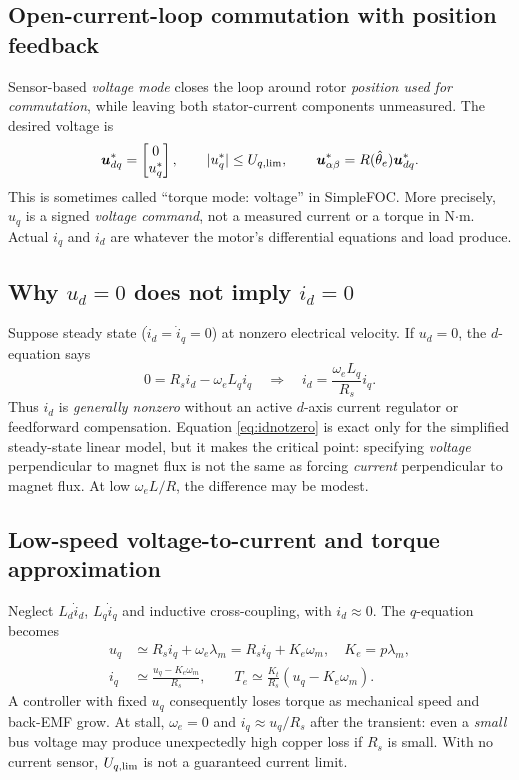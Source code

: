 \documentclass[10pt,letterpaper]{article}
\begin{document}
\subsection{Open-current-loop commutation with position feedback}
Sensor-based \emph{voltage mode} closes the loop around rotor \emph{position used for commutation}, while leaving both stator-current components unmeasured. The desired voltage is
\begin{equation}\label{eq:voltmode}
\bm u_{dq}^*=\begin{bmatrix}0\\u_q^*\end{bmatrix},\qquad
|u_q^*|\le U_{q,\rm lim},\qquad \bm u_{\alpha\beta}^*=R(\hat\theta_e)\bm u_{dq}^*.
\end{equation}
This is sometimes called ``torque mode: voltage'' in SimpleFOC. More precisely, $u_q$ is a signed \emph{voltage command}, not a measured current or a torque in N$\cdot$m. Actual $i_q$ and $i_d$ are whatever the motor's differential equations and load produce.

\subsection{Why $u_d=0$ does not imply $i_d=0$}
Suppose steady state ($\dot i_d=\dot i_q=0$) at nonzero electrical velocity. If $u_d=0$, the $d$-equation says
\begin{equation}\label{eq:idnotzero}
0=R_si_d-\omega_eL_qi_q\quad\Longrightarrow\quad i_d=\frac{\omega_eL_q}{R_s}i_q.
\end{equation}
Thus $i_d$ is \emph{generally nonzero} without an active $d$-axis current regulator or feedforward compensation. Equation \eqref{eq:idnotzero} is exact only for the simplified steady-state linear model, but it makes the critical point: specifying \emph{voltage} perpendicular to magnet flux is not the same as forcing \emph{current} perpendicular to magnet flux. At low $\omega_e L/R$, the difference may be modest.

\subsection{Low-speed voltage-to-current and torque approximation}
Neglect $L_d\dot i_d$, $L_q\dot i_q$ and inductive cross-coupling, with $i_d\approx0$. The $q$-equation becomes
\begin{align}\label{eq:uqiq}
u_q&\simeq R_s i_q+\omega_e\lambda_m = R_s i_q+K_e\omega_m,\quad K_e=p\lambda_m,\\
i_q&\simeq\frac{u_q-K_e\omega_m}{R_s},\qquad
T_e\simeq \frac{K_t}{R_s}(u_q-K_e\omega_m).
\end{align}
A controller with fixed $u_q$ consequently loses torque as mechanical speed and back-EMF grow. At stall, $\omega_e=0$ and $i_q\approx u_q/R_s$ after the transient: even a \emph{small} bus voltage may produce unexpectedly high copper loss if $R_s$ is small. With no current sensor, $U_{q,\rm lim}$ is not a guaranteed current limit.
\end{document}
